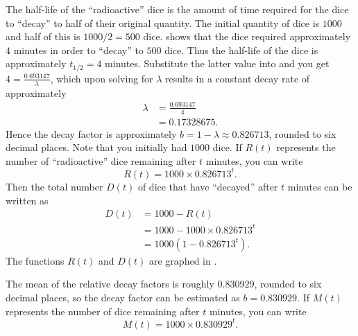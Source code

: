 \documentclass[a4paper,oneside,12pt]{article}
\begin{document}
\begin{problem}
{\begin{solution}
The half-life of the ``radioactive'' dice is the amount of time
required for the dice to ``decay'' to half of their original quantity.
The initial quantity of dice is $1000$ and half of this is
$1000 / 2 = 500$ dice.   shows that the
dice required approximately $4$ minutes in order to ``decay'' to $500$
dice.  Thus the half-life of the dice is approximately $t_{1/2} = 4$
minutes.  Substitute the latter value into
 and you get
$4 = \frac{0.693147}{\lambda}$, which upon solving for $\lambda$
results in a constant decay rate of approximately
\begin{align*}
\lambda
&=
\frac{0.693147}{4} \\[4pt]
&=
0.17328675.
\end{align*}
Hence the decay factor is approximately
$b = 1 - \lambda \approx 0.826713$, rounded to six decimal places.
Note that you initially had $1000$ dice.  If $R(t)$ represents the
number of ``radioactive'' dice remaining after $t$ minutes, you can
write
\begin{equation}
\label{eqn:radioactive_dice_decay_constant_formula}
R(t)
=
1000 \times 0.826713^t.
\end{equation}
Then the total number $D(t)$ of dice that have ``decayed'' after $t$
minutes can be written as
\begin{equation}
\label{eqn:radioactive_dice_total_decayed}
\begin{aligned}
D(t)
&=
1000 - R(t) \\[4pt]
&=
1000 - 1000 \times 0.826713^t \\[4pt]
&=
1000(1 - 0.826713^t).
\end{aligned}
\end{equation}
The functions $R(t)$ and $D(t)$ are graphed in
.

The mean of the relative decay factors is roughly $0.830929$, rounded
to six decimal places, so the decay factor can be estimated as
$b = 0.830929$.  If $M(t)$ represents the number of dice remaining
after $t$ minutes, you can write
\begin{equation}
\label{eqn:radioactive_dice_mean_decay_rate}
M(t)
=
1000 \times 0.830929^t.
\end{equation}


\end{solution}}
\end{problem}
\end{document}
